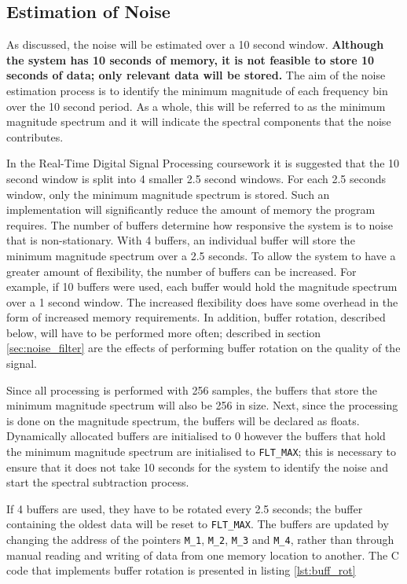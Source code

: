 \documentclass[a4paper,pra,twocolumn,10pt,aps,longbibliography,nobalancelastpage]{revtex4-1}
\begin{document}
\subsection{Estimation of Noise}\label{sec:noise_est}
As discussed, the noise will be estimated over a 10 second window. \textbf{Although the system has 10 seconds of memory, it is not feasible to store 10 seconds of data; only relevant data will be stored.} The aim of the noise estimation process is to identify the minimum magnitude of each frequency bin over the 10 second period. As a whole, this will be referred to as the minimum magnitude spectrum and it will indicate the spectral components that the noise contributes. 

In the Real-Time Digital Signal Processing coursework it is suggested that the 10 second window is split into 4 smaller 2.5 second windows. For each 2.5 seconds window, only the minimum magnitude spectrum is stored. Such an implementation will significantly reduce the amount of memory the program requires. The number of buffers determine how responsive the system is to noise that is non-stationary. With 4 buffers, an individual buffer will store the minimum magnitude spectrum over a 2.5 seconds. To allow the system to have a greater amount of flexibility, the number of buffers can be increased. For example, if 10 buffers were used, each buffer would hold the magnitude spectrum over a 1 second window. The increased flexibility does have some overhead in the form of increased memory requirements. In addition, buffer rotation, described below, will have to be performed more often; described in section \ref{sec:noise_filter} are the effects of performing buffer rotation on the quality of the signal. 

Since all processing is performed with 256 samples, the buffers that store the minimum magnitude spectrum will also be 256 in size. Next, since the processing is done on the magnitude spectrum, the buffers will be declared as floats. Dynamically allocated buffers are initialised to 0 however the buffers that hold the minimum magnitude spectrum are initialised to {\tt FLT\_MAX}; this is necessary to ensure that it does not take 10 seconds for the system to identify the noise and start the spectral subtraction process. 

If 4 buffers are used, they have to be rotated every 2.5 seconds; the buffer containing the oldest data will be reset to {\tt FLT\_MAX}. The buffers are updated by changing the address of the pointers {\tt M\_1}, {\tt M\_2}, {\tt M\_3} and {\tt M\_4}, rather than through manual reading and writing of data from one memory location to another. The C code that implements buffer rotation is presented in listing \ref{lst:buff_rot}
\end{document}
